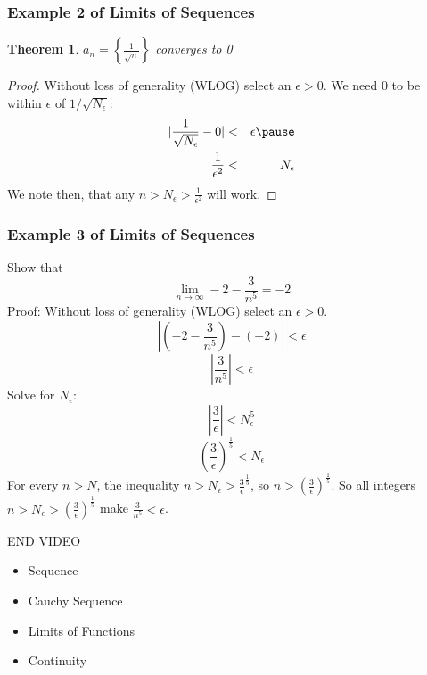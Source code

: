 \documentclass{beamer}
\newtheorem{thm}{Theorem}
\numberwithin{equation}{section}
\begin{document}
\begin{frame}
\frametitle{Example 2 of Limits of Sequences}
\begin{thm} $a_n=\left\{ \frac{1}{\sqrt{n}} \right\}$ converges to 0 
\end{thm} 
\pause
\begin{proof}  Without loss of generality (WLOG) select an $\epsilon>0$.   We need 0 to be within $\epsilon$ of $1/\sqrt{N_{\epsilon}}$:\pause
\begin{eqnarray}
|\frac{ 1} {\sqrt{N_{\epsilon}}} - 0 | & < &  \epsilon  \nonumber \pause \\
\frac{1}{\epsilon^2} & < & N_{\epsilon} \nonumber
\end{eqnarray}\pause
We note then, that any $n> N_{\epsilon} > \frac{1}{\epsilon^2}$ will work.
\end{proof}

\end{frame}




\begin{frame}
\frametitle{Example 3 of Limits of Sequences}

Show that 
$$\lim_{n\rightarrow \infty} -2 - \frac{3}{n^5}=-2$$
\pause
Proof: Without loss of generality (WLOG) select an $\epsilon>0$.\pause
$$|(-2- \frac{3}{n^5}) - (-2) | <  \epsilon$$\pause
$$|\frac{3}{n^5}| < \epsilon$$\pause
Solve for $N_{\epsilon}$:
$$|\frac{3}{\epsilon}|  <  N_{\epsilon}^5$$
$$\left(\frac{3}{\epsilon}\right)^{\frac{1}{5}} < N_{\epsilon}$$
For every $n>N$, the inequality $n>N_{\epsilon}>\frac{3}{\epsilon}^{\frac{1}{5}}$,
so $n>\left(\frac{3}{\epsilon}\right)^{\frac{1}{5}}$.  So all integers $n> N_{\epsilon}>\left(\frac{3}{\epsilon}\right)^{\frac{1}{5}}$ make $\frac{3}{n^5}<\epsilon$.


\end{frame}


\begin{frame}
END VIDEO

\end{frame}






\begin{frame}

\begin{itemize}
\item \textcolor{mygray}{Sequence}
 
\item \textcolor{myblack}{Cauchy Sequence}
\item \textcolor{mygray}{Limits of Functions}
\item \textcolor{mygray}{Continuity}
\end{itemize}

\end{frame}
\end{document}
